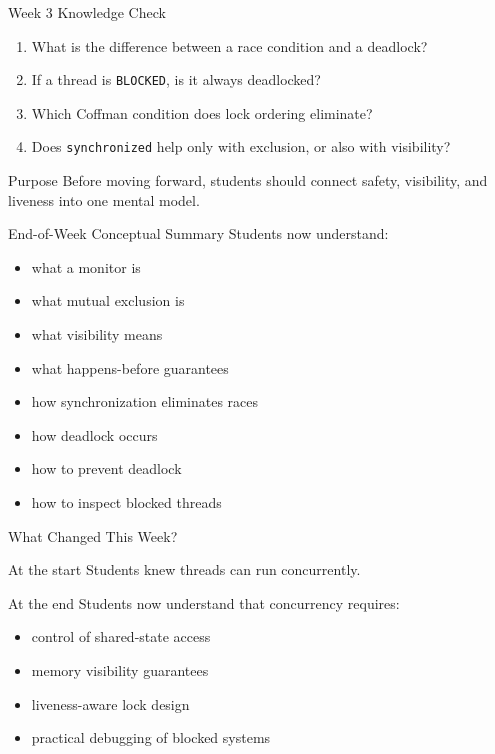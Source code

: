 \documentclass[aspectratio=169,11pt]{beamer}
\begin{document}
	\begin{frame}{Week 3 Knowledge Check}
		\begin{enumerate}
			\item What is the difference between a race condition and a deadlock?
			\item If a thread is \texttt{BLOCKED}, is it always deadlocked?
			\item Which Coffman condition does lock ordering eliminate?
			\item Does \texttt{synchronized} help only with exclusion, or also with visibility?
		\end{enumerate}
		
		\bigskip
		
		\begin{alertblock}{Purpose}
			Before moving forward, students should connect safety, visibility, and liveness into one mental model.
		\end{alertblock}
	\end{frame}
	
	\begin{frame}{End-of-Week Conceptual Summary}
		Students now understand:
		
		\begin{itemize}
			\item what a monitor is
			\item what mutual exclusion is
			\item what visibility means
			\item what happens-before guarantees
			\item how synchronization eliminates races
			\item how deadlock occurs
			\item how to prevent deadlock
			\item how to inspect blocked threads
		\end{itemize}
	\end{frame}
	
	\begin{frame}{What Changed This Week?}
		\begin{block}{At the start}
			Students knew threads can run concurrently.
		\end{block}
		
		\bigskip
		
		\begin{block}{At the end}
			Students now understand that concurrency requires:
			\begin{itemize}
				\item control of shared-state access
				\item memory visibility guarantees
				\item liveness-aware lock design
				\item practical debugging of blocked systems
			\end{itemize}
		\end{block}
	\end{frame}
	
\end{document}
